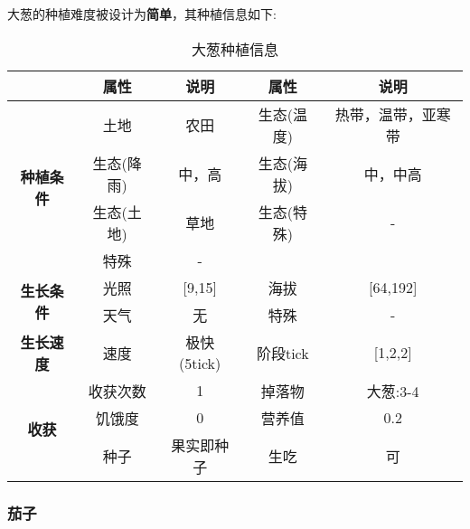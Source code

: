 大葱的种植难度被设计为\textbf{简单}，其种植信息如下:

\begin{table}[H]
    \centering
    \caption{大葱种植信息}
    \label{table:大葱种植信息}
    \setlength{\tabcolsep}{4mm}
    \begin{tabular}{c|cc|cc}
        \toprule
                                           & \textbf{属性} & \textbf{说明} & \textbf{属性} & \textbf{说明} \\
        \midrule
        \multirow{4}{*}{\textbf{种植条件}} & 土地          & 农田          & 生态(温度)    & 热带，温带，亚寒带    \\
                                           & 生态(降雨)    & 中，高        & 生态(海拔)    & 中，中高            \\
                                           & 生态(土地)    & 草地          & 生态(特殊)    & -             \\
                                           & 特殊          & -                                             \\
        \midrule
        \multirow{2}{*}{\textbf{生长条件}} & 光照          & [9,15]        & 海拔          & [64,192]      \\
                                           & 天气          & 无            & 特殊          & -             \\
        \midrule
        \textbf{生长速度}                  & 速度          & 极快(5tick)     & 阶段tick      & [1,2,2]       \\
        \midrule
        \multirow{3}{*}{\textbf{收获}}     & 收获次数      & 1           & 掉落物        & 大葱:3-4      \\
                                           & 饥饿度        & 0          & 营养值        & 0.2           \\
                                           & 种子          & 果实即种子  & 生吃          & 可   \\
        \bottomrule
    \end{tabular}
\end{table}

\subsubsection{茄子}

